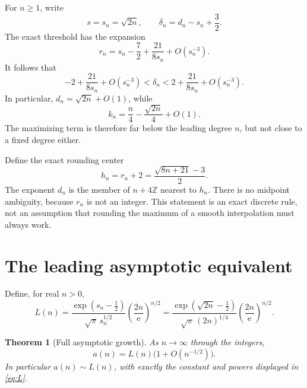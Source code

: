\documentclass[11pt,letterpaper]{article}
\newtheorem{theorem}{Theorem}[section]
\theoremstyle{remark}
\newcommand{\ZZ}{\mathbb{Z}}
\newcommand{\ee}{\mathrm{e}}
\begin{document}
For $n\ge1$, write
\begin{equation}\label{eq:sdelta}
 s=s_n=\sqrt{2n},
 \qquad
 \delta_n=d_n-s_n+\frac32.
\end{equation}
The exact threshold has the expansion
\begin{equation}\label{eq:rexpansion}
 r_n=s_n-\frac72+\frac{21}{8s_n}+O(s_n^{-3}).
\end{equation}
It follows that
\begin{equation}\label{eq:deltabound}
 -2+\frac{21}{8s_n}+O(s_n^{-3})
 <\delta_n<
 2+\frac{21}{8s_n}+O(s_n^{-3}).
\end{equation}
In particular, $d_n=\sqrt{2n}+O(1)$, while
\[
 k_n=\frac n4-\frac{\sqrt{2n}}4+O(1).
\]
The maximizing term is therefore far below the leading degree $n$, but
not close to a fixed degree either.

Define the exact rounding center
\begin{equation}\label{eq:roundcenter}
 h_n=r_n+2=\frac{\sqrt{8n+21}-3}{2}.
\end{equation}
The exponent $d_n$ is the member of $n+4\ZZ$ nearest to $h_n$.
There is no midpoint ambiguity, because $r_n$ is not an integer.
This statement is an exact discrete rule, not an assumption that rounding
the maximum of a smooth interpolation must always work.

\section{The leading asymptotic equivalent}\label{sec:leading}

Define, for real $n>0$,
\begin{equation}\label{eq:L}
 L(n)=\frac{\exp(s_n-\tfrac12)}{\sqrt\pi\,s_n^{1/2}}
       \left(\frac{2n}{\ee}\right)^{n/2}
 =\frac{\exp(\sqrt{2n}-\tfrac12)}{\sqrt\pi\,(2n)^{1/4}}
       \left(\frac{2n}{\ee}\right)^{n/2}.
\end{equation}

\begin{theorem}[Full asymptotic growth]\label{thm:leading}
As $n\to\infty$ through the integers,
\begin{equation}\label{eq:mainequiv}
 \boxed{\displaystyle a(n)=L(n)\bigl(1+O(n^{-1/2})\bigr).}
\end{equation}
In particular $a(n)\sim L(n)$, with exactly the constant and powers displayed
in \eqref{eq:L}.
\end{theorem}
\end{document}
